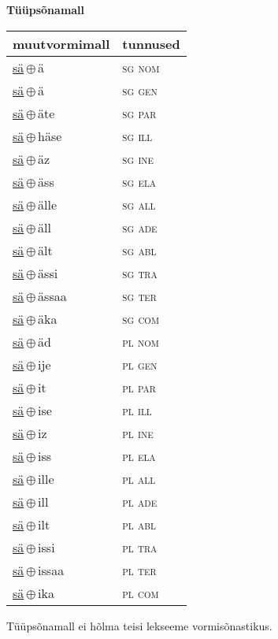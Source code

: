 

\vspace{3.5em}
\noindent \begin{minipage}{\textwidth}
\noindent \textbf{Tüüpsõnamall \,}\\

\begin{sideways}
\begin{tabular}{l l}
muutvormimall & tunnused \\
\hline
\underline{sä}\,$\oplus$\,ä & \textsc{ sg nom } \\
\underline{sä}\,$\oplus$\,ä & \textsc{ sg gen } \\
\underline{sä}\,$\oplus$\,äte & \textsc{ sg par } \\
\underline{sä}\,$\oplus$\,häse & \textsc{ sg ill } \\
\underline{sä}\,$\oplus$\,äz & \textsc{ sg ine } \\
\underline{sä}\,$\oplus$\,äss & \textsc{ sg ela } \\
\underline{sä}\,$\oplus$\,älle & \textsc{ sg all } \\
\underline{sä}\,$\oplus$\,äll & \textsc{ sg ade } \\
\underline{sä}\,$\oplus$\,ält & \textsc{ sg abl } \\
\underline{sä}\,$\oplus$\,ässi & \textsc{ sg tra } \\
\underline{sä}\,$\oplus$\,ässaa & \textsc{ sg ter } \\
\underline{sä}\,$\oplus$\,äka & \textsc{ sg com } \\
\underline{sä}\,$\oplus$\,äd & \textsc{ pl nom } \\
\underline{sä}\,$\oplus$\,ije & \textsc{ pl gen } \\
\underline{sä}\,$\oplus$\,it & \textsc{ pl par } \\
\underline{sä}\,$\oplus$\,ise & \textsc{ pl ill } \\
\underline{sä}\,$\oplus$\,iz & \textsc{ pl ine } \\
\underline{sä}\,$\oplus$\,iss & \textsc{ pl ela } \\
\underline{sä}\,$\oplus$\,ille & \textsc{ pl all } \\
\underline{sä}\,$\oplus$\,ill & \textsc{ pl ade } \\
\underline{sä}\,$\oplus$\,ilt & \textsc{ pl abl } \\
\underline{sä}\,$\oplus$\,issi & \textsc{ pl tra } \\
\underline{sä}\,$\oplus$\,issaa & \textsc{ pl ter } \\
\underline{sä}\,$\oplus$\,ika & \textsc{ pl com } \\
\end{tabular}
\end{sideways}
\label{tab:tüüpsõnamall-sää}

\end{minipage}

 
\vspace{1em}
\noindent Tüüpsõnamall  ei hõlma teisi lekseeme vormi\-sõnastikus.
